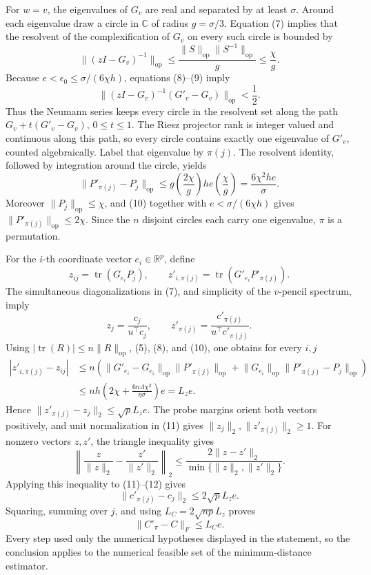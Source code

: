 For \(w=v\), the eigenvalues of \(G_v\) are real and separated by at least \(\sigma\). Around each eigenvalue draw a circle in \(\mathbb C\) of radius \(g=\sigma/3\). Equation (7) implies that the resolvent of the complexification of \(G_v\) on every such circle is bounded by
\[
 \lVert(zI-G_v)^{-1}\rVert_{\mathrm{op}}
 \le\frac{\lVert S\rVert_{\mathrm{op}}\lVert S^{-1}\rVert_{\mathrm{op}}}{g}
 \le\frac\chi g.
 \tag{9}
\]
Because \(e<\epsilon_0\le\sigma/(6\chi h)\), equations (8)--(9) imply
\[
 \lVert(zI-G_v)^{-1}(G'_v-G_v)\rVert_{\mathrm{op}}<\frac12.
\]
Thus the Neumann series keeps every circle in the resolvent set along the path \(G_v+t(G'_v-G_v)\), \(0\le t\le1\). The Riesz projector rank is integer valued and continuous along this path, so every circle contains exactly one eigenvalue of \(G'_v\), counted algebraically. Label that eigenvalue by \(\pi(j)\). The resolvent identity, followed by integration around the circle, yields
\[
 \lVert P'_{\pi(j)}-P_j\rVert_{\mathrm{op}}
 \le g\left(\frac{2\chi}{g}\right)he\left(\frac\chi g\right)
 =\frac{6\chi^2he}{\sigma}.
 \tag{10}
\]
Moreover \(\lVert P_j\rVert_{\mathrm{op}}\le\chi\), and (10) together with \(e<\sigma/(6\chi h)\) gives \(\lVert P'_{\pi(j)}\rVert_{\mathrm{op}}\le2\chi\). Since the \(n\) disjoint circles each carry one eigenvalue, \(\pi\) is a permutation.

For the \(i\)-th coordinate vector \(e_i\in\mathbb R^p\), define
\[
 z_{ij}=\operatorname{tr}(G_{e_i}P_j),
 \qquad
 z'_{i,\pi(j)}=\operatorname{tr}(G'_{e_i}P'_{\pi(j)}).
\]
The simultaneous diagonalizations in (7), and simplicity of the \(v\)-pencil spectrum, imply
\[
 z_j=\frac{c_j}{u^\top c_j},
 \qquad
 z'_{\pi(j)}=\frac{c'_{\pi(j)}}{u^\top c'_{\pi(j)}}.
 \tag{11}
\]
Using \(|\operatorname{tr}(R)|\le n\lVert R\rVert_{\mathrm{op}}\), (5), (8), and (10), one obtains for every \(i,j\)
\[
 \begin{aligned}
 |z'_{i,\pi(j)}-z_{ij}|
 &\le n\left(
 \lVert G'_{e_i}-G_{e_i}\rVert_{\mathrm{op}}
 \lVert P'_{\pi(j)}\rVert_{\mathrm{op}}
 +\lVert G_{e_i}\rVert_{\mathrm{op}}
 \lVert P'_{\pi(j)}-P_j\rVert_{\mathrm{op}}
 \right)\\
 &\le nh\left(2\chi+\frac{6n\Lambda\chi^2}{\eta\sigma}\right)e
 =L_ze.
 \end{aligned}
 \tag{12}
\]
Hence \(\lVert z'_{\pi(j)}-z_j\rVert_2\le\sqrt pL_ze\). The probe margins orient both vectors positively, and unit normalization in (11) gives \(\lVert z_j\rVert_2,\lVert z'_{\pi(j)}\rVert_2\ge1\). For nonzero vectors \(z,z'\), the triangle inequality gives
\[
 \left\lVert\frac z{\lVert z\rVert_2}-
 \frac{z'}{\lVert z'\rVert_2}\right\rVert_2
 \le\frac{2\lVert z-z'\rVert_2}
 {\min\{\lVert z\rVert_2,\lVert z'\rVert_2\}}.
\]
Applying this inequality to (11)--(12) gives
\[
 \lVert c'_{\pi(j)}-c_j\rVert_2\le2\sqrt pL_ze.
\]
Squaring, summing over \(j\), and using \(L_C=2\sqrt{np}L_z\) proves
\[
 \lVert C'_{\pi}-C\rVert_F\le L_Ce.
\]
Every step used only the numerical hypotheses displayed in the statement, so the conclusion applies to the numerical feasible set of the minimum-distance estimator.